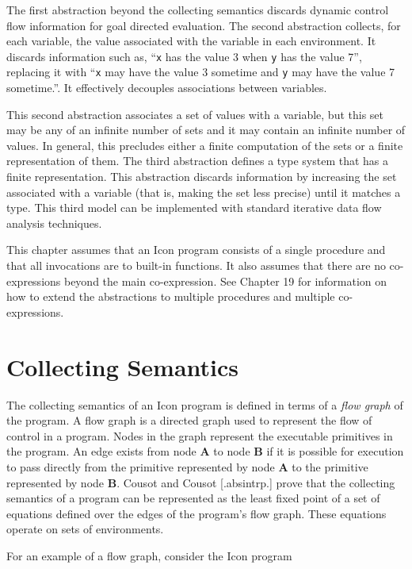 The first abstraction beyond the collecting semantics discards dynamic
control flow information for goal directed evaluation. The second
abstraction collects, for each variable, the value associated with the
variable in each environment. It discards information such as,
``\texttt{x} has the value 3 when \texttt{y} has the value 7'',
replacing it with ``\texttt{x} may have the value 3 sometime
and \texttt{y} may have the value 7 sometime.''. It effectively
decouples associations between variables.

This second abstraction associates a set of values with a variable,
but this set may be any of an infinite number of sets and it may
contain an infinite number of values. In general, this precludes
either a finite computation of the sets or a finite representation of
them. The third abstraction defines a type system that has a finite
representation.  This abstraction discards information by increasing
the set associated with a variable (that is, making the set less
precise) until it matches a type. This third model can be implemented
with standard iterative data flow analysis techniques.

This chapter assumes that an Icon program consists of a single
procedure and that all invocations are to built-in functions. It also
assumes that there are no co-expressions beyond the main
co-expression. See Chapter 19 for information on how to extend the
abstractions to multiple procedures and multiple co-expressions.


\section{Collecting Semantics}

The collecting semantics of an Icon program is defined in terms of a
\textit{flow graph} of the program. A flow graph is a directed graph
used to represent the flow of control in a program. Nodes in the graph
represent the executable primitives in the program. An edge exists
from node \textbf{A} to node \textbf{B} if it is possible for
execution to pass directly from the primitive represented by node
\textbf{A} to the primitive represented by node \textbf{B}. Cousot and
Cousot [.absintrp.] prove that the collecting semantics of a program
can be represented as the least fixed point of a set of equations
defined over the edges of the program's flow graph. These equations
operate on sets of environments.

For an example of a flow graph, consider the Icon program 

